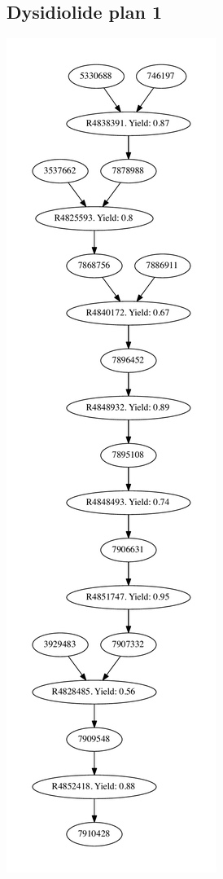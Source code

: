 \documentclass[a4paper,10pt,titlepage]{paper}
\begin{document}
\subsection{Dysidiolide plan 1}
\centering
\includegraphics[scale=0.4]{Synteseplaner/Dysidiolide/plan1.pdf}
\label{Appendix::Dysidiolide1}
\end{document}
